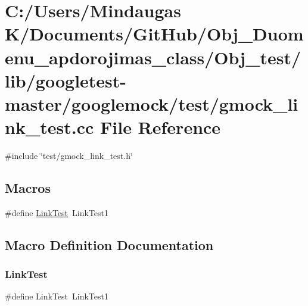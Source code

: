 \hypertarget{_obj__test_2lib_2googletest-master_2googlemock_2test_2gmock__link__test_8cc}{}\section{C\+:/\+Users/\+Mindaugas K/\+Documents/\+Git\+Hub/\+Obj\+\_\+\+Duomenu\+\_\+apdorojimas\+\_\+class/\+Obj\+\_\+test/lib/googletest-\/master/googlemock/test/gmock\+\_\+link\+\_\+test.cc File Reference}
\label{_obj__test_2lib_2googletest-master_2googlemock_2test_2gmock__link__test_8cc}
{\ttfamily \#include \char`\"{}test/gmock\+\_\+link\+\_\+test.\+h\char`\"{}}\newline
\subsection*{Macros}
\begin{DoxyCompactItemize}
\item 
\#define \mbox{\hyperlink{_obj__test_2lib_2googletest-master_2googlemock_2test_2gmock__link__test_8cc_afb3d3e7fd53242710a55460595d750bb}{Link\+Test}}~Link\+Test1
\end{DoxyCompactItemize}


\subsection{Macro Definition Documentation}
\mbox{\label{_obj__test_2lib_2googletest-master_2googlemock_2test_2gmock__link__test_8cc_afb3d3e7fd53242710a55460595d750bb}} 
\subsubsection{\texorpdfstring{LinkTest}{LinkTest}}
{\footnotesize\ttfamily \#define Link\+Test~Link\+Test1}

